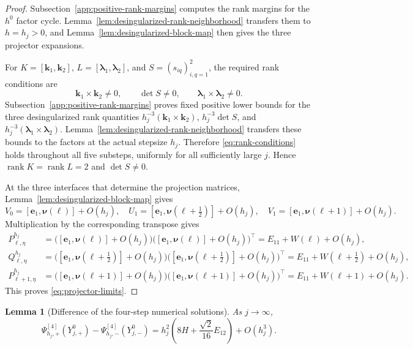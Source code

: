 \documentclass[10pt,a4paper]{amsart}
\numberwithin{equation}{section}
\newtheorem{lemma}[theorem]{Lemma}
\newcommand{\rank}{\operatorname{rank}}
\begin{document}
\begin{proof}
Subsection~\ref{app:positive-rank-margins} computes the rank margins for
the $h^0$ factor cycle.  Lemma~\ref{lem:desingularized-rank-neighborhood}
transfers them to $h=h_j>0$, and
Lemma~\ref{lem:desingularized-block-map} then gives the three projector
expansions.

For
$K=[\boldsymbol k_1,\boldsymbol k_2]$,
$L=[\boldsymbol\lambda_1,\boldsymbol\lambda_2]$, and
$S=(s_{iq})_{i,q=1}^2$, the required rank conditions are
\begin{equation}\label{eq:rank-conditions}
 \boldsymbol k_1\times\boldsymbol k_2\ne0,
 \qquad \det S\ne0,
 \qquad \boldsymbol\lambda_1\times\boldsymbol\lambda_2\ne0.
\end{equation}
Subsection~\ref{app:positive-rank-margins} proves fixed positive lower
bounds for the three desingularized rank quantities
$h_j^{-3}(\boldsymbol k_1\times\boldsymbol k_2)$,
$h_j^{-3}\det S$, and
$h_j^{-3}(\boldsymbol\lambda_1\times\boldsymbol\lambda_2)$.
Lemma~\ref{lem:desingularized-rank-neighborhood} transfers
these bounds to the factors at the actual stepsize $h_j$.  Therefore
\eqref{eq:rank-conditions} holds throughout all five substeps,
uniformly for all sufficiently large $j$.  Hence
$\rank K=\rank L=2$ and $\det S\ne0$.

At the three interfaces that determine the projection matrices,
Lemma~\ref{lem:desingularized-block-map} gives
\[
 V_0=[\boldsymbol e_1,\boldsymbol\nu(\ell)]+O(h_j),\quad
 U_1=[\boldsymbol e_1,\boldsymbol\nu(\ell+\tfrac12)]+O(h_j),\quad
 V_1=[\boldsymbol e_1,\boldsymbol\nu(\ell+1)]+O(h_j).
\]
Multiplication by the corresponding transpose gives
\begin{align*}
 P^{h_j}_{\ell,\eta}
 &=\bigl([\boldsymbol e_1,\boldsymbol\nu(\ell)]+O(h_j)\bigr)
   \bigl([\boldsymbol e_1,\boldsymbol\nu(\ell)]+O(h_j)\bigr)^\top
   =E_{11}+W(\ell)+O(h_j),\\
 Q^{h_j}_{\ell,\eta}
 &=\bigl([\boldsymbol e_1,\boldsymbol\nu(\ell+\tfrac12)]+O(h_j)\bigr)
   \bigl([\boldsymbol e_1,\boldsymbol\nu(\ell+\tfrac12)]+O(h_j)\bigr)^\top
   =E_{11}+W(\ell+\tfrac12)+O(h_j),\\
 P^{h_j}_{\ell+1,\eta}
 &=\bigl([\boldsymbol e_1,\boldsymbol\nu(\ell+1)]+O(h_j)\bigr)
   \bigl([\boldsymbol e_1,\boldsymbol\nu(\ell+1)]+O(h_j)\bigr)^\top
   =E_{11}+W(\ell+1)+O(h_j).
\end{align*}
This proves \eqref{eq:projector-limits}.
\end{proof}

\begin{lemma}[Difference of the four-step numerical solutions]
\label{lem:numerical-difference}
As $j\to\infty$,
\begin{equation}\label{eq:numerical-difference}
 \Psi^{[4]}_{h_j,+}(Y_{j,+}^0)-\Psi^{[4]}_{h_j,-}(Y_{j,-}^0)
 =h_j^2\left(8H+\frac{\sqrt2}{16}E_{12}\right)+O(h_j^3).
\end{equation}
\end{lemma}
\end{document}
